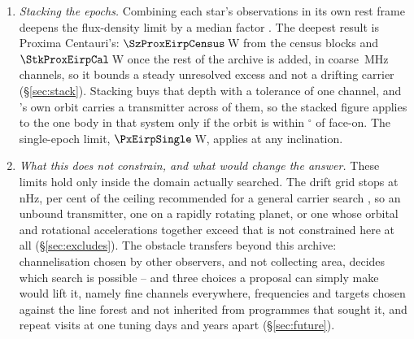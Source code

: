 \begin{enumerate}[leftmargin=1.6em,itemsep=4pt,topsep=4pt,parsep=0pt]
\item \emph{Stacking the epochs.} Combining each star's observations in its
own rest frame deepens the flux-density limit by a median factor \SyStkGainMed. The
deepest result is Proxima Centauri's: $\SzProxEirpCensus$\,W from the census
blocks and $\StkProxEirpCal$\,W once the rest of the archive is added, in
coarse \ChanBModeMHz\,MHz channels, so it bounds a steady unresolved excess
and not a drifting carrier (\S\ref{sec:stack}). Stacking buys that depth
with a tolerance of one channel, and \PxPlanet's own orbit carries a
transmitter across \PxNChanWalk{} of them, so the stacked figure applies to
the one body in that system only if the orbit is within
\PxIncMaxDeg$^\circ$ of face-on. The single-epoch limit,
$\PxEirpSingle$\,W, applies at any inclination.

\item \emph{What this does not constrain, and what would change the
answer.} These limits hold only inside the domain actually searched. The
drift grid stops at \DriftCeilLo\,nHz, \AccelSheikhPct{} per cent of the
ceiling recommended for a general carrier search \citep{Sheikh2019}, so an
unbound transmitter, one on a rapidly rotating planet, or one whose orbital
and rotational accelerations together exceed that is not constrained here at
all (\S\ref{sec:excludes}). The obstacle transfers beyond
this archive: channelisation chosen by other observers, and not collecting area,
decides which search is possible -- and three choices a proposal can simply
make would lift it, namely fine channels everywhere, frequencies and targets
chosen against the line forest and not inherited from programmes that
sought it, and repeat visits at one tuning days and years apart
(\S\ref{sec:future}).

\end{enumerate}
